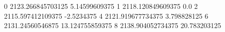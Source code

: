 0 2123.266845703125 5.14599609375
1 2118.120849609375 0.0
2 2115.597412109375 -2.5234375
4 2121.919677734375 3.798828125
6 2131.24560546875 13.124755859375
8 2138.904052734375 20.783203125
